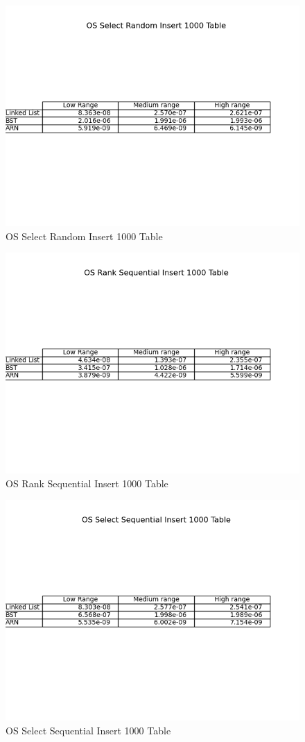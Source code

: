 \documentclass[11pt]{article}
\begin{document}
 \begin{figure}[H]
  \centering
  \includegraphics[width=0.8\linewidth]{Images/1000/OS Select Random Insert 1000 Table.png}
  \caption{OS Select Random Insert 1000 Table }
  \label{fig:OS Select Random Insert 1000 Table}
\end{figure}
 \begin{figure}[H]
  \centering
  \includegraphics[width=0.8\linewidth]{Images/1000/OS Rank Sequential Insert 1000 Table.png}
  \caption{OS Rank Sequential Insert 1000 Table }
  \label{fig:OS Rank Sequential Insert 1000 Table}
\end{figure}
 \begin{figure}[H]
  \centering
  \includegraphics[width=0.8\linewidth]{Images/1000/OS Select Sequential Insert 1000 Table.png}
  \caption{OS Select Sequential Insert 1000 Table }
  \label{fig:OS Select Sequential Insert 1000 Table}
\end{figure}
\end{document}
